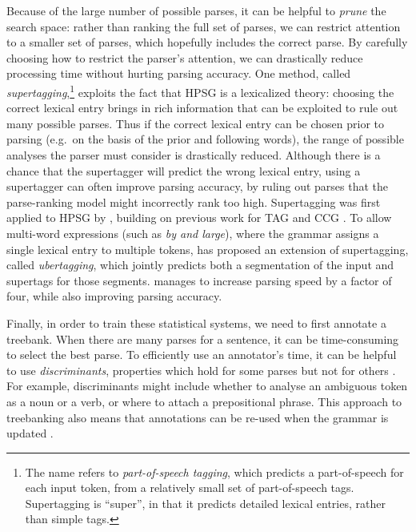 \documentclass[output=paper,nonflat]{langsci/langscibook}
\begin{document}
Because of the large number of possible parses,
it can be helpful to \textit{prune} the search space:
rather than ranking the full set of parses,
we can restrict attention to a smaller set of parses,
which hopefully includes the correct parse.
By carefully choosing how to restrict the parser's attention,
we can drastically reduce processing time without hurting parsing accuracy.
One method, called \textit{supertagging},\footnote{%
	The name refers to \textit{part-of-speech tagging},
	which predicts a part-of-speech for each input token,
	from a relatively small set of part-of-speech tags.
	Supertagging is ``super'', in that it predicts detailed lexical entries, rather than simple tags.
}
exploits the fact that HPSG is a lexicalized theory:
choosing the correct lexical entry brings in rich information
that can be exploited to rule out many possible parses.
Thus if the correct lexical entry can be chosen prior to parsing
(e.g.\ on the basis of the prior and following words),
the range of possible analyses the parser must consider is drastically reduced.
Although there is a chance that the supertagger will predict the wrong lexical entry,
using a supertagger can often improve parsing accuracy,
by ruling out parses that the parse-ranking model might incorrectly rank too high.
Supertagging was first applied to HPSG by \citet{matsuzaki2007supertag},
building on previous work for TAG \citep{bangalore1999supertag}
and CCG \citep{clark2004supertag}.
To allow multi-word expressions (such as \textit{by and large}),
where the grammar assigns a single lexical entry to multiple tokens,
\citet{dridan2013ubertag} has proposed an extension of supertagging, called \textit{ubertagging},
which jointly predicts both a segmentation of the input and supertags for those segments.
\citeauthor{dridan2013ubertag} manages to increase parsing speed by a factor of four,
while also improving parsing accuracy.


Finally, in order to train these statistical systems,
we need to first annotate a treebank.
When there are many parses for a sentence,
it can be time-consuming to select the best parse.
To efficiently use an annotator's time,
it can be helpful to use \textit{discriminants},
properties which hold for some parses but not for others \citep{Carter:97}.
For example, discriminants might include
whether to analyse an ambiguous token as a noun or a verb,
or where to attach a prepositional phrase.
This approach to treebanking also means that
annotations can be re-used when the grammar is updated
\citep{OFTM2004a-u,Fli:Oep:Ben:17}.
\end{document}
